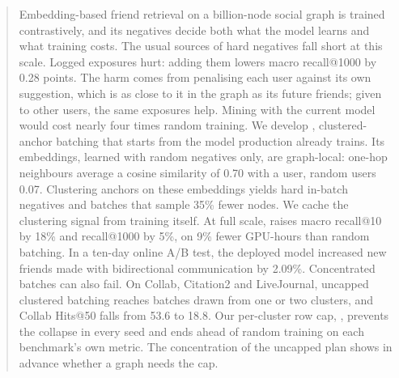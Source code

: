 \begin{abstract}
Embedding-based friend retrieval on a billion-node social graph is trained contrastively, and its negatives decide both
what the model learns and what training costs. The usual sources of hard negatives fall short at this scale. Logged
exposures hurt: adding them lowers macro recall@1000 by 0.28 points. The harm comes from penalising each user against
its own suggestion, which is as close to it in the graph as its future friends; given to other users, the same
exposures help.
Mining with the current model would cost nearly four times random training. We develop \ours{}, clustered-anchor batching that
starts from the model production already trains. Its embeddings, learned with random negatives only, are graph-local:
one-hop neighbours average a cosine similarity of 0.70 with a user, random users 0.07. Clustering anchors on these
embeddings yields hard in-batch negatives and batches that sample 35\% fewer nodes. We cache the clustering signal from
training itself. At full scale, \ours{} raises macro recall@10 by 18\% and recall@1000 by 5\%,
on 9\% fewer GPU-hours than random batching. In a ten-day online A/B test, the deployed model increased new friends
made with bidirectional communication by 2.09\%. Concentrated batches can also fail. On Collab, Citation2 and
LiveJournal, uncapped clustered batching reaches batches drawn from one or two clusters, and Collab Hits@50 falls from
53.6 to 18.8. Our per-cluster row cap, \rowcap{}, prevents the collapse in every seed and ends ahead of random training on each
benchmark's own metric. The concentration of the uncapped plan shows in advance whether a graph needs the cap.
\end{abstract}
